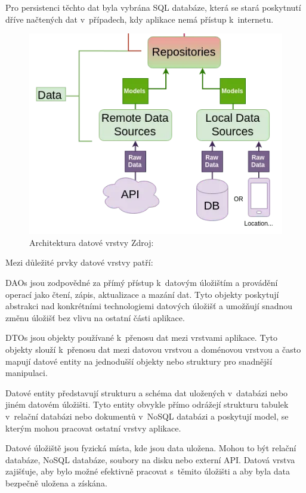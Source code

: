 Pro persistenci těchto dat byla vybrána SQL databáze, která se stará poskytnutí dříve načtených dat v~případech, kdy aplikace nemá přístup k~internetu.


\begin{figure}[H]
  \centering
  \includegraphics[width=.5\textwidth]{data_layer_diagram.png}
  \caption{Architektura datové vrstvy Zdroj: \cite{imgDataFlow}}
  \label{fig:arch_data_layer}
\end{figure}


Mezi důležité prvky datové vrstvy patří:

DAOs jsou zodpovědné za přímý přístup k~datovým úložištím a provádění operací jako čtení, zápis, aktualizace a mazání dat. Tyto objekty 
poskytují abstrakci nad konkrétními technologiemi datových úložišť a umožňují snadnou změnu úložišť bez vlivu na ostatní části aplikace.

DTOs jsou objekty používané k~přenosu dat mezi vrstvami aplikace. Tyto objekty slouží k~přenosu dat mezi datovou vrstvou a doménovou 
vrstvou a často mapují datové entity na jednodušší objekty nebo struktury pro snadnější manipulaci.

Datové entity představují strukturu a schéma dat uložených v~databázi nebo jiném datovém úložišti. Tyto entity obvykle přímo odrážejí
strukturu tabulek v~relační databázi nebo dokumentů v~NoSQL databázi a poskytují model, se kterým mohou pracovat ostatní vrstvy aplikace.

Datové úložiště jsou fyzická místa, kde jsou data uložena. Mohou to být relační databáze, NoSQL databáze, soubory na disku nebo externí API. 
Datová vrstva zajišťuje, aby bylo možné efektivně pracovat s~těmito úložišti a aby byla data bezpečně uložena a získána.

